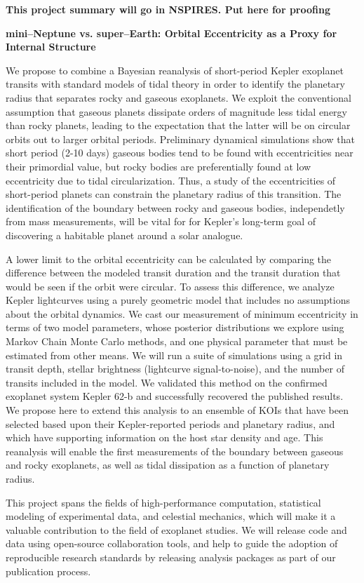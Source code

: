 \centerline{\bf This project summary will go in NSPIRES.  Put here for proofing} \medskip

\centerline{\bf mini--Neptune vs. super--Earth: Orbital Eccentricity as a Proxy for Internal Structure} \medskip

We propose to combine a Bayesian reanalysis of short-period Kepler
exoplanet transits with standard models of tidal theory in order to
identify the planetary radius that separates rocky and gaseous
exoplanets. We exploit the conventional assumption that gaseous
planets dissipate orders of magnitude less tidal energy than rocky
planets, leading to the expectation that the latter will be on
circular orbits out to larger orbital periods. Preliminary dynamical
simulations show that short period (2-10 days) gaseous bodies tend to
be found with eccentricities near their primordial value, but rocky
bodies are preferentially found at low eccentricity due to tidal
circularization.  Thus, a study of the eccentricities of short-period
planets can constrain the planetary radius of this transition.  The
identification of the boundary between rocky and gaseous bodies,
independetly from mass measurements, will be vital for for Kepler's
long-term goal of discovering a habitable planet around a solar
analogue.

A lower limit to the orbital eccentricity can be calculated by
comparing the difference between the modeled transit duration and the
transit duration that would be seen if the orbit were circular.  To
assess this difference, we analyze Kepler lightcurves using a purely
geometric model that includes no assumptions about the orbital
dynamics.  We cast our measurement of minimum eccentricity in terms of
two model parameters, whose posterior distributions we explore using
Markov Chain Monte Carlo methods, and one physical parameter that must
be estimated from other means.  We will run a suite of simulations
using a grid in transit depth, stellar brightness (lightcurve
signal-to-noise), and the number of transits included in the model.
%
%
We validated this method on the confirmed exoplanet system Kepler 62-b
and successfully recovered the published results. We propose here to
extend this analysis to an ensemble of KOIs that have been selected
based upon their Kepler-reported periods and planetary radius, and
which have supporting information on the host star density and age.
This reanalysis will enable the first measurements of the boundary
between gaseous and rocky exoplanets, as well as tidal dissipation as
a function of planetary radius.

This project spans the fields of high-performance computation,
statistical modeling of experimental data, and celestial mechanics,
which will make it a valuable contribution to the field of exoplanet
studies.  We will release code and data using open-source
collaboration tools, and help to guide the adoption of reproducible
research standards by releasing analysis packages as part of our
publication process.

